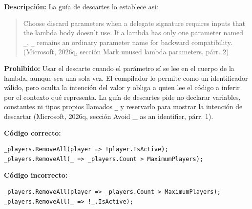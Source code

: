 \textbf{Descripción:} La guía de descartes lo establece así:
\begin{quote}
Choose discard parameters when a delegate signature requires inputs that the lambda body doesn't use. If a lambda has only one parameter named \texttt{\_}, \texttt{\_} remains an ordinary parameter name for backward compatibility. (Microsoft, 2026q, sección Mark unused lambda parameters, párr. 2)
\end{quote}

\textbf{Prohibido:} Usar el descarte cuando el parámetro sí se lee en el cuerpo de la lambda, aunque sea una sola vez. El compilador lo permite como un identificador válido, pero oculta la intención del valor y obliga a quien lee el código a inferir por el contexto qué representa. La guía de descartes pide no declarar variables, constantes ni tipos propios llamados \texttt{\_} y reservarlo para mostrar la intención de descartar (Microsoft, 2026q, sección Avoid \_ as an identifier, párr. 1).

\textbf{Código correcto:}
\begin{lstlisting}[style=csharpstyle]
_players.RemoveAll(player => !player.IsActive);
_players.RemoveAll(_ => _players.Count > MaximumPlayers);
\end{lstlisting}

\textbf{Código incorrecto:}
\begin{lstlisting}[style=csharpstyle]
_players.RemoveAll(player => _players.Count > MaximumPlayers);
_players.RemoveAll(_ => !_.IsActive);
\end{lstlisting}
